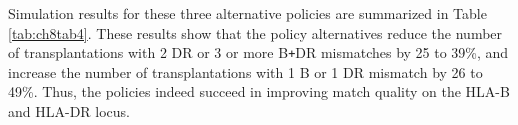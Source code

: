\documentclass[11pt,twoside,]{book}
\def\Plus{\texttt{+}}
\begin{document}
\begingroup
\setlength{\aboverulesep}{0.2ex}
\setlength{\belowrulesep}{0.1ex}

\begin{table}[h]
\caption{Overview of the points awarded per locus for the alternative HLA-matching policies.}
\label{tab:ch8tab3}
\centering
{}
\end{table}

\FloatBarrier

Simulation results for these three alternative policies are summarized
in Table \ref{tab:ch8tab4}. These results show that the policy
alternatives reduce the number of transplantations with 2 DR or 3 or more B\Plus DR mismatches by 25 to 39\%, and
increase the number of transplantations with 1 B or 1 DR mismatch by 26
to 49\%. Thus, the policies indeed succeed in improving match quality on
the HLA-B and HLA-DR locus.
\end{document}
